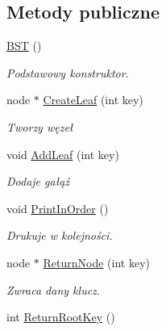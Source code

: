 \subsection*{\-Metody publiczne}
\begin{DoxyCompactItemize}
\item 
\hypertarget{class_b_s_t_abc17123a0367c3b8ad0382eeb3ad3178}{\hyperlink{class_b_s_t_abc17123a0367c3b8ad0382eeb3ad3178}{\-B\-S\-T} ()}\label{class_b_s_t_abc17123a0367c3b8ad0382eeb3ad3178}

\begin{DoxyCompactList}\small\item\em \-Podstawowy konstruktor. \end{DoxyCompactList}\item 
\hypertarget{class_b_s_t_ac98b54e3b9fbccce245258a5d6bc16c6}{node $\ast$ \hyperlink{class_b_s_t_ac98b54e3b9fbccce245258a5d6bc16c6}{\-Create\-Leaf} (int key)}\label{class_b_s_t_ac98b54e3b9fbccce245258a5d6bc16c6}

\begin{DoxyCompactList}\small\item\em \-Tworzy węzeł \end{DoxyCompactList}\item 
\hypertarget{class_b_s_t_a51d7bf8ed788f5d91c64320b37ee3b1d}{void \hyperlink{class_b_s_t_a51d7bf8ed788f5d91c64320b37ee3b1d}{\-Add\-Leaf} (int key)}\label{class_b_s_t_a51d7bf8ed788f5d91c64320b37ee3b1d}

\begin{DoxyCompactList}\small\item\em \-Dodaje gałąź \end{DoxyCompactList}\item 
\hypertarget{class_b_s_t_ad52d9269768a75944a926ab7b87993a8}{void \hyperlink{class_b_s_t_ad52d9269768a75944a926ab7b87993a8}{\-Print\-In\-Order} ()}\label{class_b_s_t_ad52d9269768a75944a926ab7b87993a8}

\begin{DoxyCompactList}\small\item\em \-Drukuje w kolejności. \end{DoxyCompactList}\item 
\hypertarget{class_b_s_t_a714306d301f48c3a23dd67e33d72f088}{node $\ast$ \hyperlink{class_b_s_t_a714306d301f48c3a23dd67e33d72f088}{\-Return\-Node} (int key)}\label{class_b_s_t_a714306d301f48c3a23dd67e33d72f088}

\begin{DoxyCompactList}\small\item\em \-Zwraca dany klucz. \end{DoxyCompactList}\item 
\hypertarget{class_b_s_t_a821d045dd12a823f88cc75f625e0d2e3}{int \hyperlink{class_b_s_t_a821d045dd12a823f88cc75f625e0d2e3}{\-Return\-Root\-Key} ()}\label{class_b_s_t_a821d045dd12a823f88cc75f625e0d2e3}


\end{DoxyCompactItemize}
